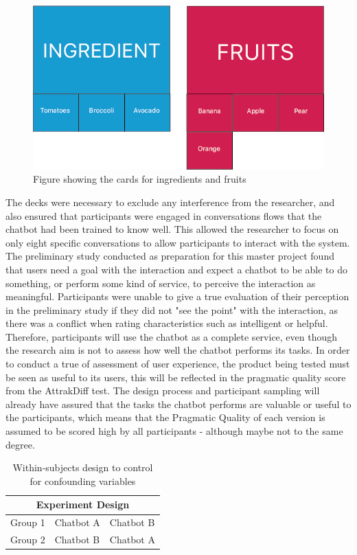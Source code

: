      \begin{figure}[h]
            \centering
            \includegraphics[scale=0.5]{figures/Ingredientfruit.png}
            \caption{Figure showing the cards for ingredients and fruits}
            \label{fig:ingfruit}
        \end{figure}

   The decks were necessary to exclude any interference from the researcher, and also ensured that participants were engaged in conversations flows that the chatbot had been trained to know well. This allowed the researcher to focus on only eight specific conversations to allow participants to interact with the system. The preliminary study conducted as preparation for this master project found that users need a goal with the interaction and expect a chatbot to be able to do something, or perform some kind of service, to perceive the interaction as meaningful. Participants were unable to give a true evaluation of their perception in the preliminary study if they did not "see the point" with the interaction, as there was a conflict when rating characteristics such as intelligent or helpful. Therefore, participants will use the chatbot as a complete service, even though the research aim is not to assess how well the chatbot performs its tasks. In order to conduct a true of assessment of user experience, the product being tested must be seen as useful to its users, this will be reflected in the pragmatic quality score from the AttrakDiff test. The design process and participant sampling will already have assured that the tasks the chatbot performs are valuable or useful to the participants, which means that the Pragmatic Quality of each version is assumed to be scored high by all participants - although maybe not to the same degree.
   
   \begin{table}[h]
    \begin{tabular}{ |p{3cm}||p{5cm}||p{5cm}| }
    \hline
    \multicolumn{3}{|c|}{Experiment Design} \\
    \hline
    Group 1 &   Chatbot A & Chatbot B \\
    \hline   
    Group 2 &   Chatbot B & Chatbot A \\
    \hline
    \end{tabular}
    \caption{Within-subjects design to control for confounding variables}
    \label{table:4}
    \end{table}
   
